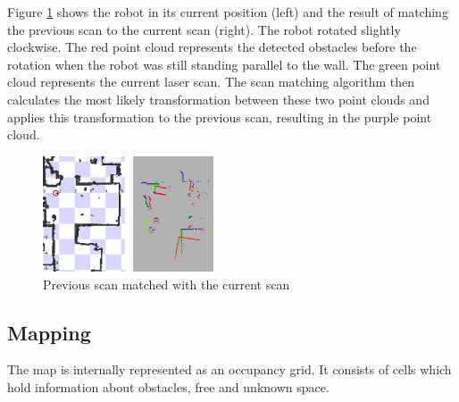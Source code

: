 \documentclass{ba-kecs}
\begin{document}
Figure \ref{fig:scanmatcher} shows the robot in its current position (left) and the result of matching the previous scan to the current scan (right). The robot rotated slightly clockwise. The red point cloud represents the detected obstacles before the rotation when the robot was still standing parallel to the wall. The green point cloud represents the current laser scan. The scan matching algorithm then calculates the most likely transformation between these two point clouds and applies this transformation to the previous scan, resulting in the purple point cloud.

\begin{figure}[htbp]
	\centering
		\includegraphics[width=0.45\textwidth]{figures/Scanmatch.jpg}
	\caption{Previous scan matched with the current scan}
	\label{fig:scanmatcher}
\end{figure}

\subsection{Mapping}
\label{sec:mapping}
The map is internally represented as an occupancy grid. It consists of cells which hold information about obstacles, free and unknown space. 
\end{document}
